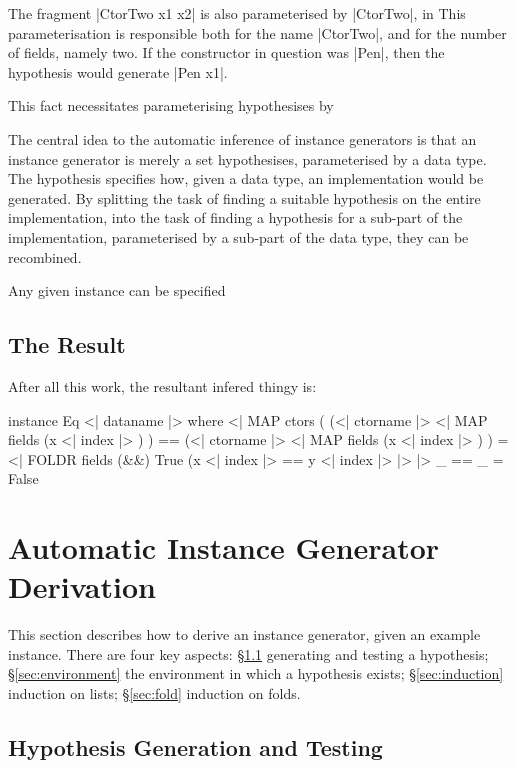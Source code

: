 \documentclass{llncs}
\begin{document}
The fragment |CtorTwo x1 x2| is also parameterised by |CtorTwo|, in This parameterisation is responsible both for the name |CtorTwo|, and for the number of fields, namely two. If the constructor in question was |Pen|, then the hypothesis would generate |Pen x1|.



This fact necessitates parameterising hypothesises by


The central idea to the automatic inference of instance generators is that an instance generator is merely a set hypothesises, parameterised by a data type. The hypothesis specifies how, given a data type, an implementation would be generated. By splitting the task of finding a suitable hypothesis on the entire implementation, into the task of finding a hypothesis for a sub-part of the implementation, parameterised by a sub-part of the data type, they can be recombined.


 Any given instance can be specified



\subsection{The Result}

After all this work, the resultant infered thingy is:

\begin{code}
instance Eq \? <| dataname |> where
    <| MAP ctors (
        (<| ctorname |> \? <| MAP fields (x <| index |> ) ) ==
        (<| ctorname |> \? <| MAP fields (x <| index |> ) ) =
        <| FOLDR fields (&&) True (x <| index |> == y <| index |> |>
    |>
    _ == _ = False
\end{code}


\section{Automatic Instance Generator Derivation}
\label{sec:automatic_instances}

This section describes how to derive an instance generator, given an example instance. There are four key aspects: \S\ref{sec:generation} generating and testing a hypothesis; \S\ref{sec:environment} the environment in which a hypothesis exists; \S\ref{sec:induction} induction on lists; \S\ref{sec:fold} induction on folds.

\subsection{Hypothesis Generation and Testing}
\label{sec:generation}
\end{document}
